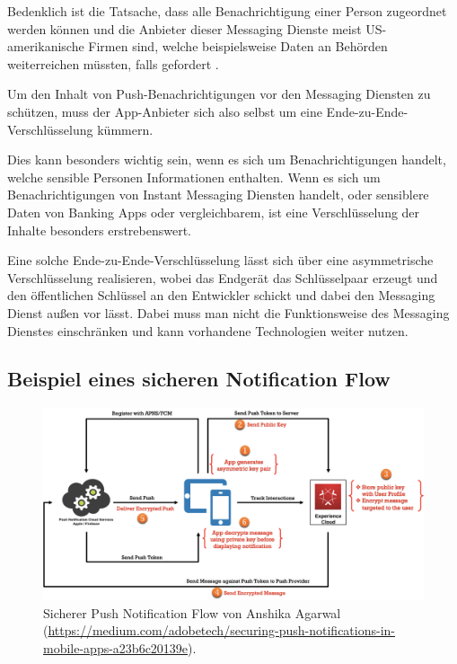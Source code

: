 \documentclass[sigconf]{acmart}
\begin{document}
Bedenklich ist die Tatsache, dass alle Benachrichtigung 
einer Person zugeordnet werden können und die Anbieter dieser Messaging 
Dienste meist US-amerikanische Firmen sind, welche beispielsweise 
Daten an Behörden weiterreichen müssten, falls gefordert \cite{google2}.

Um den Inhalt von Push-Benachrichtigungen vor den Messaging Diensten 
zu schützen, muss der App-Anbieter sich also selbst um eine 
Ende-zu-Ende-Verschlüsselung kümmern.

Dies kann besonders wichtig sein, wenn es sich um Benachrichtigungen 
handelt, welche sensible Personen Informationen enthalten. Wenn es 
sich um Benachrichtigungen von Instant Messaging Diensten handelt, 
oder sensiblere Daten von Banking Apps oder vergleichbarem, 
ist eine Verschlüsselung der Inhalte besonders erstrebenswert.

Eine solche Ende-zu-Ende-Verschlüsselung lässt sich über eine 
asymmetrische Verschlüsselung realisieren, wobei das 
Endgerät das Schlüsselpaar erzeugt und den öffentlichen Schlüssel an 
den Entwickler schickt und dabei den Messaging Dienst außen vor lässt. 
Dabei muss man nicht die Funktionsweise des Messaging Dienstes 
einschränken und kann vorhandene Technologien weiter nutzen.



\subsection{Beispiel eines sicheren Notification Flow}

\begin{figure}[H]
  \centering
  \includegraphics[width=\linewidth]{sample-secureflow}
  \caption{Sicherer Push Notification Flow von Anshika Agarwal (\url{https://medium.com/adobetech/securing-push-notifications-in-mobile-apps-a23b6c20139e}).}
\end{figure}
\end{document}

